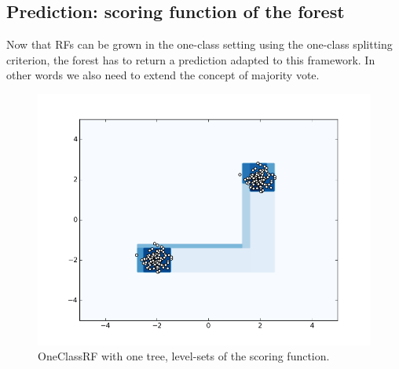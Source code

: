 \subsection{Prediction: scoring function of the forest}
\label{ocrf:sec:prediction}
 Now that \acp{RF} can be grown in the one-class setting using the one-class
 splitting criterion, the forest has to return a prediction adapted to this
 framework.  In other words we also need to extend the concept of majority
 vote.
%
\begin{figure}[htb]
    \centering
    \includegraphics[width=\textwidth]{./gfx/oneclassrf.png}
    \caption[One Class Random Forest level-sets]{\ac{OneClassRF} with one tree,
    level-sets of the scoring function. \label{ocrf:fig:oneclassrf}}
\end{figure}


